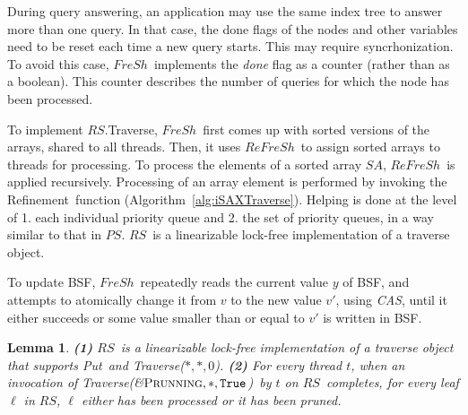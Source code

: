 \documentclass[a4paper,11pt,twoside,openany]{book}
\newtheorem{lemma}{Lemma}[section]
\newcommand{\CAS}{\mbox{\textit{CAS}}}
\newcommand{\True}{\mbox{\texttt{True}}}
\newcommand{\Put}{\mbox{\sc Put}}
\newcommand{\Traverse}{\mbox{\sc Traverse}}
\newcommand{\Prunning}{\mbox{\sc Prunning}}
\newcommand{\Refinement}{\mbox{\sc Refinement}}
\newcommand{\PS}{\mbox{$\mathit{PS}$}}
\newcommand{\RS}{\mbox{$\mathit{RS}$}}
\newcommand{\Refresh}{\mbox{$\mathit{ReFreSh}$}}
\newcommand{\Fresh}{\mbox{$\mathit{FreSh}$}}
\begin{document}
    
    
    During query answering, an application may use the same index tree
    to answer more than one query. In that case, the done flags of the nodes and other
    variables need to be reset each time a new query starts. This may require syncrhonization. 
    To avoid this case, \Fresh\ implements the {\em done} flag as a counter (rather than as a boolean). 
    This counter describes the number of queries for which the node has been processed.
    
    To implement \RS.\Traverse, \Fresh\ first comes up with sorted versions of the arrays,
    shared to all threads. Then, it uses \Refresh\ to assign sorted arrays to threads 
    for processing. To process the elements of a sorted array $SA$, \Refresh\ is
    applied recursively. 
    Processing of an array element is performed by invoking the \Refinement\ function
    (Algorithm~\ref{alg:iSAXTraverse}). Helping is done at the level of 
    1. each individual priority queue and 
    2. the set of priority queues, in a way similar to that in \PS.
    \RS\ is a linearizable lock-free implementation of a traverse object. 
    
    To update BSF, \Fresh\ repeatedly reads the current value $y$ of BSF, and attempts to
    atomically change it from $v$ to the new value $v'$, using \CAS, until it either succeeds or some value 
    smaller than or equal to $v'$ is written in BSF.
    
    
    \begin{lemma}
    \label{lem:rs}
    {\bf (1)} \RS\ is a linearizable lock-free implementation of a traverse object that supports \Put\ and
    \Traverse($\mathit{*, *, 0}$). 
    {\bf (2)} For every thread $t$, when an invocation of \Traverse(\&$\mathit{\Prunning, *, \True}$)\ by $t$ on \RS\ completes, 
    for every leaf $\ell$ in $\RS$, $\ell$ either has been processed or it has been pruned.
    \end{lemma}
    
\end{document}
